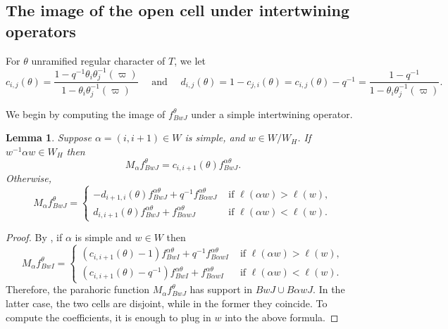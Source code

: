 \documentclass{amsart}
\newtheorem{lemma}[thm]{Lemma}
\theoremstyle{definition}
\begin{document}
{\subsection{The image of the open cell under intertwining operators}
For $\theta$ unramified regular character   of $T$, we let 
\[c_{i,j}(\theta)=\dfrac{1-q^{-1}\theta_i\theta_j^{-1}(\varpi)}{1-\theta_i\theta_j^{-1}(\varpi)}\quad \text{~and }\quad d_{i,j}(\theta)=1-c_{j,i}(\theta)=c_{i,j}(\theta)-q^{-1}=\dfrac{1-q^{-1}}{1-\theta_i\theta_j^{-1}(\varpi)}.\] 

We begin by computing the image of $f_{BwJ}^\theta$ under a simple
intertwining operator.
\begin{lemma}\label{l:parahoric-intertwining}
Suppose $\alpha=(i,i+1)\in W$ is simple, and $w\in W/W_H$. If
$w^{-1}\alpha w\in W_H$ then
\[M_\alpha f^\theta_{BwJ}=c_{i,i+1}(\theta)f^{\alpha \theta}_{BwJ}.\]
Otherwise,
\[M_\alpha f^\theta_{BwJ}=\begin{cases}
-d_{i+1,i}(\theta)f_{BwJ}^{\alpha
  \theta}+q^{-1}f^{\alpha \theta}_{B \alpha wJ}&\text{ if }\ell(\alpha w)>\ell(w),\\
d_{i,i+1}(\theta)f_{BwJ}^{\alpha
  \theta}+f^{\alpha \theta}_{B \alpha wJ}&\text{ if }\ell(\alpha w)<\ell(w). 
\end{cases}
\]
\end{lemma}
\begin{proof}
By
\cite[Thm. 3.4]{casselman:unramified}, if $\alpha$ is simple and
$w\in W$ then
\[M_\alpha
f^\theta_{BwI}=\begin{cases}(c_{i,i+1}(\theta)-1)f_{BwI}^{\alpha
  \theta}+q^{-1}f^{\alpha \theta}_{B \alpha wI}&\text{ if }\ell(\alpha w)>\ell(w),\\
(c_{i,i+1}(\theta)-q^{-1})f_{BwI}^{\alpha
  \theta}+f^{\alpha \theta}_{B \alpha wI}&\text{ if }\ell(\alpha w)<\ell(w). 
\end{cases}\]
Therefore, the parahoric function $M_\alpha f_{BwJ}^\theta$ has support in $BwJ\cup B \alpha w J$. In the latter case, the two cells are disjoint, while in the former they coincide. To compute the coefficients, it is enough to plug in $w$ into the above formula.
\end{proof}



}
\end{document}
